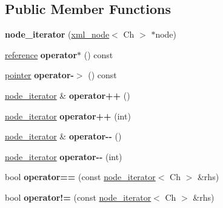 \subsection*{Public Member Functions}
\begin{DoxyCompactItemize}
\item 
\mbox{\label{classrapidxml_1_1node__iterator_a94c3da59b54e4bd003e226cc35b3c266}} 
{\bfseries node\+\_\+iterator} (\hyperlink{classrapidxml_1_1xml__node}{xml\+\_\+node}$<$ Ch $>$ $\ast$node)
\item 
\mbox{\label{classrapidxml_1_1node__iterator_a47a076383ce706bb88e2b455646d8555}} 
\hyperlink{classrapidxml_1_1xml__node}{reference} {\bfseries operator$\ast$} () const
\item 
\mbox{\label{classrapidxml_1_1node__iterator_a203f946893733b2f8526b49c3c9039ef}} 
\hyperlink{classrapidxml_1_1xml__node}{pointer} {\bfseries operator-\/$>$} () const
\item 
\mbox{\label{classrapidxml_1_1node__iterator_a8d6b184a76b2ec8a8b5e90bc013c80ed}} 
\hyperlink{classrapidxml_1_1node__iterator}{node\+\_\+iterator} \& {\bfseries operator++} ()
\item 
\mbox{\label{classrapidxml_1_1node__iterator_ad01b4e43e348a330984833fd4924d0f2}} 
\hyperlink{classrapidxml_1_1node__iterator}{node\+\_\+iterator} {\bfseries operator++} (int)
\item 
\mbox{\label{classrapidxml_1_1node__iterator_ace52107ecd1bcf02e49619e86206e3a3}} 
\hyperlink{classrapidxml_1_1node__iterator}{node\+\_\+iterator} \& {\bfseries operator-\/-\/} ()
\item 
\mbox{\label{classrapidxml_1_1node__iterator_a4ca35716bb7865f199a137b063af6080}} 
\hyperlink{classrapidxml_1_1node__iterator}{node\+\_\+iterator} {\bfseries operator-\/-\/} (int)
\item 
\mbox{\label{classrapidxml_1_1node__iterator_a5cb8a3b0d65a1a2517995e986a4debfd}} 
bool {\bfseries operator==} (const \hyperlink{classrapidxml_1_1node__iterator}{node\+\_\+iterator}$<$ Ch $>$ \&rhs)
\item 
\mbox{\label{classrapidxml_1_1node__iterator_a20f1e25347d7e3856694f18597f7c8e2}} 
bool {\bfseries operator!=} (const \hyperlink{classrapidxml_1_1node__iterator}{node\+\_\+iterator}$<$ Ch $>$ \&rhs)
\end{DoxyCompactItemize}


